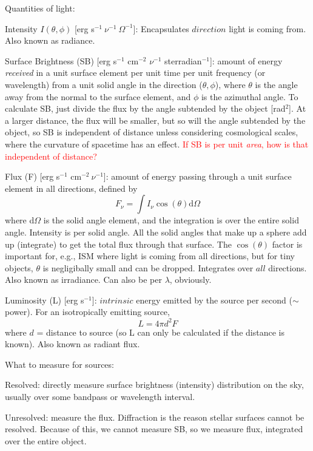\documentclass[12pt]{article}
\begin{document}
Quantities of light:
\begin{itemize*}
    \item Intensity $I(\theta,\phi)$ [erg s$^{-1}\ \nu^{-1}\ \Omega^{-1}$]:
        Encapsulates $direction$ light is coming from.
        Also known as radiance.
    \item Surface Brightness (SB)
        [erg s$^{-1}$ cm$^{-2}$ $\nu^{-1}$ sterradian$^{-1}$]:
        amount of energy \emph{received} in a unit surface
        element per unit time per unit frequency (or wavelength)
        from a unit
        solid angle in the direction ($\theta,\phi$), where $\theta$
        is the angle
        away from the normal to the surface element, and $\phi$ is the
        azimuthal angle.
        To calculate SB, just divide the flux by the angle subtended
        by the object [rad$^2$]. At a larger distance, the flux will
        be smaller, but so will the angle subtended by the object, so
        SB is independent of distance unless considering cosmological
        scales, where the curvature of spacetime has an effect.
        \textcolor{red}{If SB is per unit \emph{area}, how is that
        independent of distance?}
    \item Flux (F) [erg s$^{-1}$ cm$^{-2}\ \nu^{-1}$]:
        amount of energy passing through a unit surface element
        in all directions, defined by
        \begin{equation}
            F_{\nu} = \int I_{\nu}\cos(\theta)\textrm{d}\Omega
        \end{equation}
        where d$\Omega$ is the solid angle element, and the integration is
        over the entire solid angle. Intensity is per solid angle. All
        the solid angles that make up a sphere add up (integrate) to
        get the total flux through that surface.
        The $\cos(\theta)$ factor is important
        for, e.g., ISM where light is coming from all directions, but for
        tiny objects, $\theta$ is negligibally small and can be dropped.
        Integrates over $all$ directions.
        Also known as irradiance. Can also be per $\lambda$, obviously.
    \item Luminosity (L) [erg s$^{-1}$]:
        $intrinsic$ energy emitted by the source per
        second ($\sim$ power). For an isotropically emitting source,
        \begin{equation}
            L = 4 \pi d^2 F
        \end{equation}
        where $d$ = distance to source (so L can only be calculated if
        the distance is known). Also known as radiant flux.
\end{itemize*}
What to measure for sources:
\begin{itemize*}
    \item Resolved: directly measure surface brightness (intensity)
        distribution on the sky, usually over some bandpass or wavelength
        interval.
    \item Unresolved: measure the flux. Diffraction is the reason stellar
        surfaces cannot be resolved. Because of this, we cannot measure
        SB, so we measure flux, integrated over the entire object.
\end{itemize*}
\end{document}
